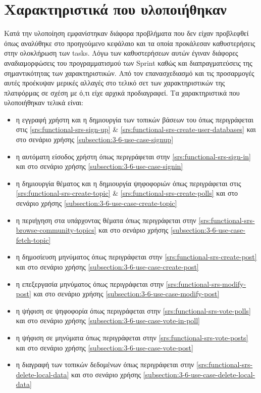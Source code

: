 \section{Χαρακτηριστικά που υλοποιήθηκαν} \label{section:4-5-implemented-parts}

Κατά την υλοποίηση εμφανίστηκαν διάφορα προβλήματα που δεν είχαν προβλεφθεί όπως αναλύθηκε στο προηγούμενο κεφάλαιο και τα οποία προκάλεσαν καθυστερήσεις στην ολοκλήρωση των tasks. Λόγω των καθυστερήσεων αυτών έγιναν διάφορες αναδιαμορφώσεις του προγραμματισμού των Sprint καθώς και διαπραγματεύσεις της σημαντικότητας των χαρακτηριστικών. Από τον επανασχεδιασμό και τις προσαρμογές αυτές προέκυψαν μερικές αλλαγές στο τελικό σετ των χαρακτηριστικών της πλατφόρμας σε σχέση με ό,τι είχε αρχικά προδιαγραφεί. Τα χαρακτηριστικά που υλοποιήθηκαν τελικά είναι:

\begin{itemize}
    \item η εγγραφή χρήστη και η δημιουργία των τοπικών βάσεων του όπως περιγράφεται στις \ref{srs:functional-srs-sign-up} \& \ref{srs:functional-srs-create-user-databases} και στο σενάριο χρήσης \ref{subsection:3-6-use-case-signup}
    \item η αυτόματη είσοδος χρήστη όπως περιγράφεται στην \ref{srs:functional-srs-sign-in} και στο σενάριο χρήσης \ref{subsection:3-6-use-case-signin}
    \item η δημιουργία θέματος και η δημιουργία ψηφοφοριών όπως περιγράφεται στις \ref{srs:functional-srs-create-topic} \& \ref{srs:functional-srs-create-polls} και στο σενάριο χρήσης \ref{subsection:3-6-use-case-create-topic}
    \item η περιήγηση στα υπάρχοντας θέματα όπως περιγράφεται στην \ref{srs:functional-srs-browse-community-topics} και στο σενάριο χρήσης \ref{subsection:3-6-use-case-fetch-topic}
    \item η δημοσίευση μηνύματος όπως περιγράφεται στην \ref{srs:functional-srs-create-post} και στο σενάριο χρήσης \ref{subsection:3-6-use-case-create-post}
    \item η επεξεργασία μηνύματος όπως περιγράφεται στην \ref{srs:functional-srs-modify-post} και στο σενάριο χρήσης \ref{subsection:3-6-use-case-modify-post}
    \item η ψήφιση σε ψηφοφορία όπως περιγράφεται στην \ref{srs:functional-srs-vote-polls} και στο σενάριο χρήσης \ref{subsection:3-6-use-case-vote-in-poll}
    \item η ψήφιση σε μηνύματα όπως περιγράφεται στην \ref{srs:functional-srs-vote-posts} και στο σενάριο χρήσης \ref{subsection:3-6-use-case-vote-post}
    \item η διαγραφή των τοπικών δεδομένων όπως περιγράφεται στην \ref{srs:functional-srs-delete-local-data} και στο σενάριο χρήσης \ref{subsection:3-6-use-case-delete-local-data}
\end{itemize}

